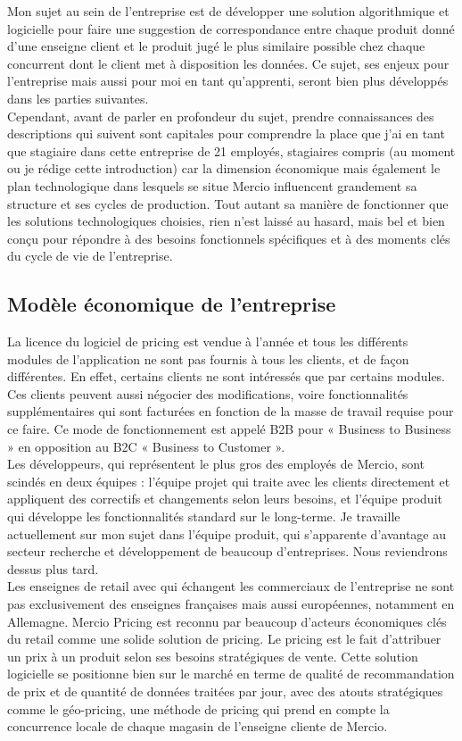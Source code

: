 \documentclass{rapportCS}
\begin{document}
	Mon sujet au sein de l'entreprise est de développer une solution algorithmique et logicielle pour 
	faire une suggestion de correspondance entre chaque produit donné d'une enseigne client et le 
	produit jugé le plus similaire possible chez chaque concurrent 
	dont le client met à disposition les données. 
	Ce sujet, ses enjeux pour l'entreprise mais aussi pour moi en tant qu'apprenti,
	seront bien plus développés dans les parties suivantes.\\
	Cependant, avant de parler en profondeur du sujet, prendre connaissances des descriptions qui
	suivent sont capitales pour comprendre la place que j'ai en tant que stagiaire dans cette 
	entreprise de 21 employés, stagiaires compris (au moment ou je rédige cette introduction) car la
	dimension économique mais également le plan technologique dans lesquels se situe Mercio influencent 
	grandement sa structure et ses cycles de production. Tout autant sa manière de fonctionner que les 
	solutions technologiques choisies, rien n'est laissé au hasard, mais bel et bien conçu pour 
	répondre à des besoins fonctionnels spécifiques et à des moments clés du cycle de vie de 
	l'entreprise.

\subsection{Modèle économique de l'entreprise}
	La licence du logiciel de pricing est vendue à l'année et tous les différents modules de 
	l'application ne sont pas fournis à tous les clients, et de façon différentes.
	En effet, certains clients ne sont intéressés que par certains modules.
	Ces clients peuvent aussi négocier des modifications, voire fonctionnalités supplémentaires 
	qui sont facturées en fonction de la masse de travail requise pour ce faire. 
	Ce mode de fonctionnement est appelé B2B pour « Business to Business » en opposition 
	au B2C « Business to Customer ». \\
	Les développeurs, qui représentent le plus gros des employés de Mercio, sont scindés en 
	deux équipes : l'équipe projet qui traite avec les clients directement et appliquent des 
	correctifs et changements selon leurs besoins, et l'équipe produit qui développe les 
	fonctionnalités standard sur le long-terme. Je travaille actuellement sur mon sujet dans 
	l'équipe produit, qui s'apparente d'avantage au secteur recherche et développement de beaucoup 
	d'entreprises. Nous reviendrons dessus plus tard. \\
	Les enseignes de retail avec qui échangent les commerciaux de l'entreprise ne sont pas 
	exclusivement des enseignes françaises mais aussi européennes, notamment en Allemagne.
	Mercio Pricing est reconnu par beaucoup d'acteurs économiques clés du retail comme une solide 
	solution de pricing. 
	Le pricing est le fait d'attribuer un prix à un produit selon ses besoins stratégiques de vente. 
	Cette solution logicielle se positionne bien sur le marché en terme de qualité de recommandation 
	de prix et de quantité de données traitées par jour, avec des atouts stratégiques comme le 
	géo-pricing, une méthode de pricing qui prend en compte la concurrence locale de chaque magasin de 
	l'enseigne cliente de Mercio. \\
\end{document}
